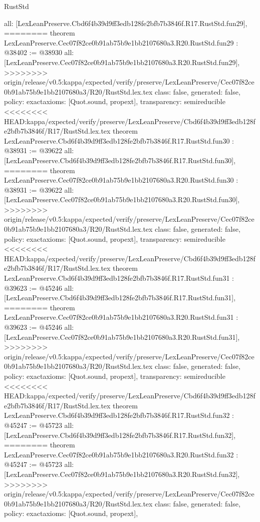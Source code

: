 \begin{lexlean}{RustStd}
\begin{coremodule}
{\begin{coremodule}
{{{{{{{{{{{{{{{{{{{{{{{{{{{{{{{{  all: [LexLeanPreserve.Cbd6f4b39d9ff3edb128fe2bfb7b3846f.R17.RustStd.fun29],
========
theorem LexLeanPreserve.Cec07f82ce0b91ab75b9e1bb2107680a3.R20.RustStd.fun29 : @38402 := @38930 {
  all: [LexLeanPreserve.Cec07f82ce0b91ab75b9e1bb2107680a3.R20.RustStd.fun29],
>>>>>>>> origin/release/v0.5:kappa/expected/verify/preserve/LexLeanPreserve/Cec07f82ce0b91ab75b9e1bb2107680a3/R20/RustStd.lex.tex
  class: false,
  generated: false,
  policy: exact{axioms: [Quot.sound, propext]},
  transparency: semireducible
}
<<<<<<<< HEAD:kappa/expected/verify/preserve/LexLeanPreserve/Cbd6f4b39d9ff3edb128fe2bfb7b3846f/R17/RustStd.lex.tex
theorem LexLeanPreserve.Cbd6f4b39d9ff3edb128fe2bfb7b3846f.R17.RustStd.fun30 : @38931 := @39622 {
  all: [LexLeanPreserve.Cbd6f4b39d9ff3edb128fe2bfb7b3846f.R17.RustStd.fun30],
========
theorem LexLeanPreserve.Cec07f82ce0b91ab75b9e1bb2107680a3.R20.RustStd.fun30 : @38931 := @39622 {
  all: [LexLeanPreserve.Cec07f82ce0b91ab75b9e1bb2107680a3.R20.RustStd.fun30],
>>>>>>>> origin/release/v0.5:kappa/expected/verify/preserve/LexLeanPreserve/Cec07f82ce0b91ab75b9e1bb2107680a3/R20/RustStd.lex.tex
  class: false,
  generated: false,
  policy: exact{axioms: [Quot.sound, propext]},
  transparency: semireducible
}
<<<<<<<< HEAD:kappa/expected/verify/preserve/LexLeanPreserve/Cbd6f4b39d9ff3edb128fe2bfb7b3846f/R17/RustStd.lex.tex
theorem LexLeanPreserve.Cbd6f4b39d9ff3edb128fe2bfb7b3846f.R17.RustStd.fun31 : @39623 := @45246 {
  all: [LexLeanPreserve.Cbd6f4b39d9ff3edb128fe2bfb7b3846f.R17.RustStd.fun31],
========
theorem LexLeanPreserve.Cec07f82ce0b91ab75b9e1bb2107680a3.R20.RustStd.fun31 : @39623 := @45246 {
  all: [LexLeanPreserve.Cec07f82ce0b91ab75b9e1bb2107680a3.R20.RustStd.fun31],
>>>>>>>> origin/release/v0.5:kappa/expected/verify/preserve/LexLeanPreserve/Cec07f82ce0b91ab75b9e1bb2107680a3/R20/RustStd.lex.tex
  class: false,
  generated: false,
  policy: exact{axioms: [Quot.sound, propext]},
  transparency: semireducible
}
<<<<<<<< HEAD:kappa/expected/verify/preserve/LexLeanPreserve/Cbd6f4b39d9ff3edb128fe2bfb7b3846f/R17/RustStd.lex.tex
theorem LexLeanPreserve.Cbd6f4b39d9ff3edb128fe2bfb7b3846f.R17.RustStd.fun32 : @45247 := @45723 {
  all: [LexLeanPreserve.Cbd6f4b39d9ff3edb128fe2bfb7b3846f.R17.RustStd.fun32],
========
theorem LexLeanPreserve.Cec07f82ce0b91ab75b9e1bb2107680a3.R20.RustStd.fun32 : @45247 := @45723 {
  all: [LexLeanPreserve.Cec07f82ce0b91ab75b9e1bb2107680a3.R20.RustStd.fun32],
>>>>>>>> origin/release/v0.5:kappa/expected/verify/preserve/LexLeanPreserve/Cec07f82ce0b91ab75b9e1bb2107680a3/R20/RustStd.lex.tex
  class: false,
  generated: false,
  policy: exact{axioms: [Quot.sound, propext]},
}}}}}}}}}}}}}}}}}}}}}}}}}}}}}}}}}}}}
\end{coremodule}}
\end{coremodule}
\end{lexlean}
